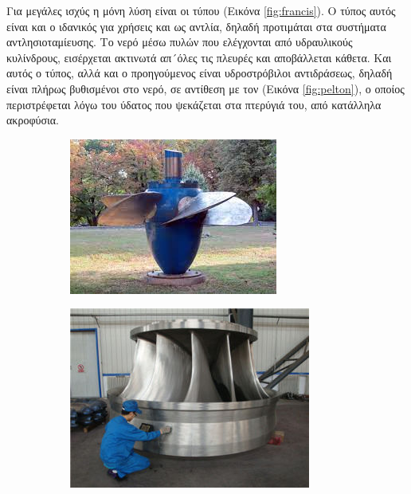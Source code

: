 \documentclass[12pt]{report}
\begin{document}
Για μεγάλες ισχύς η μόνη λύση είναι οι τύπου {} (Εικόνα \ref{fig:francis}). Ο τύπος αυτός είναι και ο ιδανικός για χρήσεις και ως αντλία, δηλαδή προτιμάται στα συστήματα αντλησιοταμίευσης. 
Το νερό μέσω πυλών που ελέγχονται από υδραυλικούς κυλίνδρους, εισέρχεται ακτινωτά απ´όλες τις πλευρές και αποβάλλεται κάθετα.
Και αυτός ο τύπος, αλλά και ο προηγούμενος είναι υδροστρόβιλοι αντιδράσεως, δηλαδή είναι πλήρως βυθισμένοι στο νερό, σε αντίθεση με τον {} (Εικόνα \ref{fig:pelton}), ο οποίος περιστρέφεται λόγω του ύδατος που 
ψεκάζεται στα πτερύγιά του, από κατάλληλα ακροφύσια.

\begin{figure}[b]
     \centering
     \begin{subfigure}[b]{0.3\textwidth}
         \centering
         \includegraphics[width=\textwidth]{kaplan}
				 \caption{{}}
         \label{fig:kaplan}
     \end{subfigure}
     \hfill
     \begin{subfigure}[b]{0.3\textwidth}
         \centering
         \includegraphics[width=\textwidth]{francis}

\end{subfigure}
\end{figure}
\end{document}
